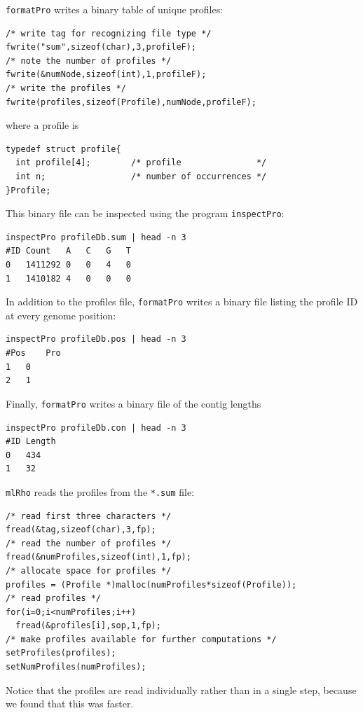 \documentclass{sig-alternate}
\newcommand{\ty}{\texttt}
\begin{document}
\ty{formatPro} writes a binary table of unique
profiles:
\begin{lstlisting}
/* write tag for recognizing file type */
fwrite("sum",sizeof(char),3,profileF);
/* note the number of profiles */
fwrite(&numNode,sizeof(int),1,profileF);
/* write the profiles */
fwrite(profiles,sizeof(Profile),numNode,profileF);
\end{lstlisting}
where a profile is
\begin{lstlisting}
typedef struct profile{  
  int profile[4];        /* profile               */
  int n;                 /* number of occurrences */
}Profile;
\end{lstlisting}
This binary file can be inspected using the program \ty{inspectPro}:
\begin{verbatim}
inspectPro profileDb.sum | head -n 3
#ID	Count	A	C	G	T
0	1411292	0	0	4	0
1	1410182	4	0	0	0
\end{verbatim}
In addition to the profiles file, \ty{formatPro} writes a binary file
listing the profile ID at every genome position:
\begin{verbatim}
inspectPro profileDb.pos | head -n 3
#Pos	Pro
1	0
2	1
\end{verbatim}
Finally, \ty{formatPro} writes a binary file of the contig lengths
\begin{verbatim}
inspectPro profileDb.con | head -n 3
#ID	Length
0	434
1	32
\end{verbatim}

\ty{mlRho} reads the profiles from the \ty{*.sum} file:
\begin{lstlisting}
/* read first three characters */
fread(&tag,sizeof(char),3,fp);
/* read the number of profiles */
fread(&numProfiles,sizeof(int),1,fp);
/* allocate space for profiles */
profiles = (Profile *)malloc(numProfiles*sizeof(Profile));
/* read profiles */
for(i=0;i<numProfiles;i++)
  fread(&profiles[i],sop,1,fp);
/* make profiles available for further computations */
setProfiles(profiles);
setNumProfiles(numProfiles);
\end{lstlisting}
Notice that the profiles are read individually rather than in a single
step, because we found that this was
faster. 
\end{document}
